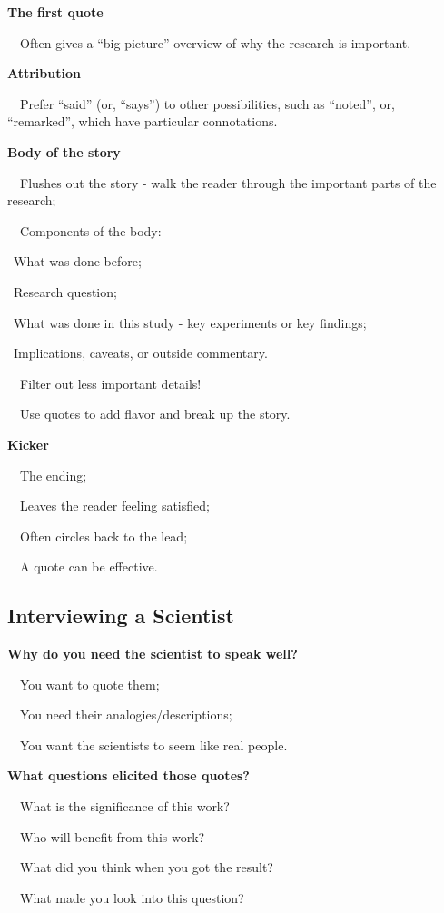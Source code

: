 \documentclass[a4paper, 12pt]{article}
\begin{document}
\textbf{The first quote}
\par\ \textbullet\ Often gives a ``big picture'' overview of why the research is important.

\textbf{Attribution}
\par\ \textbullet\ Prefer ``said'' (or, ``says'') to other possibilities, such as ``noted'', or, ``remarked'', which have particular connotations.

\textbf{Body of the story}
\par\ \textbullet\ Flushes out the story - walk the reader through the important parts of the research;
\par\ \textbullet\ Components of the body:
\par\quad\textopenbullet\ What was done before;
\par\quad\textopenbullet\ Research question;
\par\quad\textopenbullet\ What was done in this study - key experiments or key findings;
\par\quad\textopenbullet\ Implications, caveats, or outside commentary.
\par\ \textbullet\ Filter out less important details!
\par\ \textbullet\ Use quotes to add flavor and break up the story.

\newpage\textbf{Kicker}
\par\ \textbullet\ The ending;
\par\ \textbullet\ Leaves the reader feeling satisfied;
\par\ \textbullet\ Often circles back to the lead;
\par\ \textbullet\ A quote can be effective.

\subsection{Interviewing a Scientist}

\textbf{Why do you need the scientist to speak well?}
\par\ \textbullet\ You want to quote them;
\par\ \textbullet\ You need their analogies/descriptions;
\par\ \textbullet\ You want the scientists to seem like real people.

\textbf{What questions elicited those quotes?}
\par\ \textbullet\ What is the significance of this work?
\par\ \textbullet\ Who will benefit from this work?
\par\ \textbullet\ What did you think when you got the result?
\par\ \textbullet\ What made you look into this question?
\end{document}
